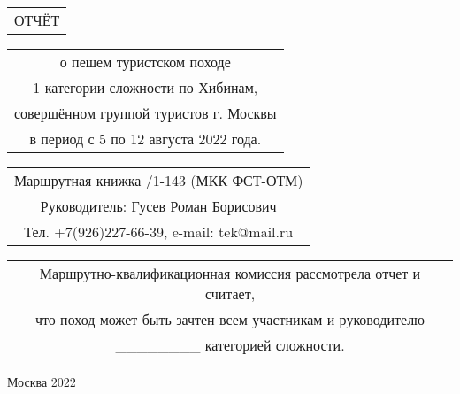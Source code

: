 \begin{titlepage}
    \noindent\parbox{\linewidth}
    {
        \vspace{100pt}
        \Large
        \begin{center} \begin{tabular}{c}
            ОТЧЁТ\\
        \end{tabular}  \end{center}
    }
    \noindent\parbox{\linewidth}
    {
        \vspace{10pt}
        \large
        \begin{center} \begin{tabular}{c}
            о пешем туристском походе\\
            1 категории сложности по Хибинам,\\
            совершённом группой туристов г. Москвы\\
            в период с 5 по 12 августа 2022 года.
        \end{tabular}  \end{center}
    }
    \noindent\parbox{\linewidth}
    {
        \vspace{20pt}
        \large
        \begin{center} \begin{tabular}{c}
            Маршрутная книжка \textnumero1/1-143 (МКК ФСТ-ОТМ)\\
            Руководитель: Гусев Роман Борисович\\
            Тел. +7(926)227-66-39, e-mail: tek@mail.ru\\
        \end{tabular}  \end{center}
    }
    \noindent\parbox{\linewidth}
    {
        \vspace{20pt}
        \normalsize
        \begin{center} \begin{tabular}{c}
            Маршрутно-квалификационная комиссия рассмотрела отчет и считает,\\
            что поход может быть зачтен всем участникам и руководителю\\
            \_\_\_\_\_\_\_\_ категорией сложности.
        \end{tabular}  \end{center}
    }
    \noindent\parbox{\linewidth}
    {
        \vspace{180pt}
        \large
        \begin{center}
            Москва 2022
        \end{center}
    }
\end{titlepage}
